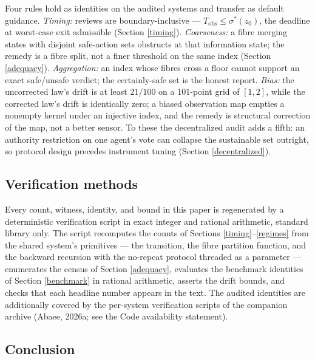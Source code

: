 \documentclass[10pt,twocolumn]{article}
\theoremstyle{definition}
\begin{document}
Four rules hold as identities on the audited systems and transfer as
default guidance. \emph{Timing:} reviews are boundary-inclusive ---
\(T_{\mathrm{obs}} \le \sigma^{*}(z_0)\), the deadline at worst-case
exit admissible (Section \ref{timing}). \emph{Coarseness:} a fibre
merging states with disjoint safe-action sets obstructs at that
information state; the remedy is a fibre split, not a finer threshold
on the same index (Section \ref{adequacy}). \emph{Aggregation:} an
index whose fibres cross a floor cannot support an exact
safe/unsafe verdict; the certainly-safe set is the honest report.
\emph{Bias:} the uncorrected law's drift is at least \(21/100\) on a
101-point grid of \([1,2]\), while the corrected law's drift is
identically zero; a biased observation map empties a nonempty kernel
under an injective index, and the remedy is structural correction of
the map, not a better sensor. To these the decentralized audit adds a
fifth: an authority restriction on one agent's vote can collapse the
sustainable set outright, so protocol design precedes instrument
tuning (Section \ref{decentralized}).

\subsection{Verification methods}\label{methods}

Every count, witness, identity, and bound in this paper is regenerated
by a deterministic verification script in exact integer and rational
arithmetic, standard library only. The script recomputes the counts of
Sections \ref{timing}--\ref{regimes} from the shared system's
primitives --- the transition, the fibre partition function, and the
backward recursion with the no-repeat protocol threaded as a parameter
--- enumerates the census of Section \ref{adequacy}, evaluates the
benchmark identities of Section \ref{benchmark} in rational
arithmetic, asserts the drift bounds, and checks that each headline
number appears in the text. The audited identities are additionally
covered by the per-system verification scripts of the companion
archive (Abaee, 2026a; see the Code availability statement).

\subsection{Conclusion}\label{conclusion}
\end{document}
